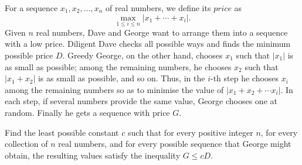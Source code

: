 For a sequence 
$x_1,x_2,\ldots,x_n$
 of real numbers, we define its 
$\textit{price}$
 as 
\[\max_{1\le i\le n}|x_1+\cdots +x_i|.\]
 Given 
$n$
 real numbers, Dave and George want to arrange them into a sequence with a low price. Diligent Dave checks all possible ways and finds the minimum possible price 
$D$.
 Greedy George, on the other hand, chooses 
$x_1$
 such that 
$|x_1 |$
 is as small as possible; among the remaining numbers, he chooses 
$x_2$
 such that 
$|x_1 + x_2 |$
 is as small as possible, and so on. Thus, in the 
$i$-th step he chooses 
$x_i$
 among the remaining numbers so as to minimise the value of 
$|x_1 + x_2 + \cdots  x_i |$.
 In each step, if several numbers provide the same value, George chooses one at random. Finally he gets a sequence with price 
$G$.


Find the least possible constant 
$c$
 such that for every positive integer 
$n$, 
 for every collection of 
$n$
 real numbers, and for every possible sequence that George might obtain, the resulting values satisfy the inequality 
$G\le cD$.


